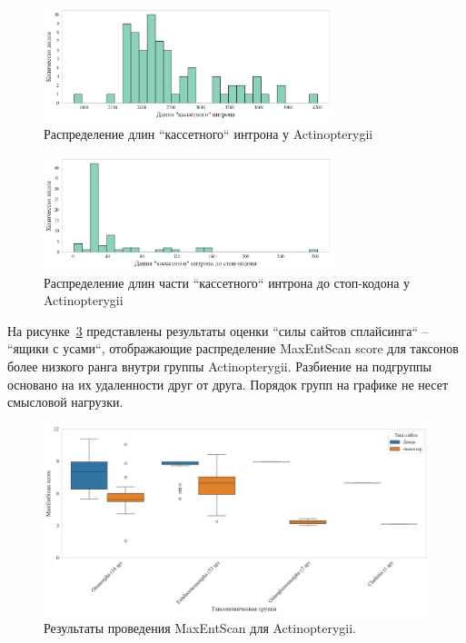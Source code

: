 \begin{figure}[hb] %
    \centering
    \includegraphics[width=0.75\textwidth]{images/Actinopterygii_intron}
    \caption{Распределение длин ``кассетного`` интрона у Actinopterygii}
    \label{fig:Actinopterygii_intron}
\end{figure}

\begin{figure}[ht] %
    \centering
    \includegraphics[width=0.75\textwidth]{images/Actinopterygii_intron_stop}
    \caption{Распределение длин части ``кассетного`` интрона до стоп-кодона у Actinopterygii}
    \label{fig:Actinopterygii_intron_stop}
\end{figure}

На рисунке~\ref{fig:Actinopterygii_maxentscan} представлены результаты оценки ``силы сайтов сплайсинга`` – ``ящики с усами``, отображающие распределение MaxEntScan score для таксонов более низкого ранга внутри группы Actinopterygii.
Разбиение на подгруппы основано на их удаленности друг от друга.
Порядок групп на графике не несет смысловой нагрузки.

\begin{figure}[h] %
    \centering
    \includegraphics[width=1.0\textwidth]{images/Actinopterygii_maxentscan}
    \caption{Результаты проведения MaxEntScan для Actinopterygii.}
    \label{fig:Actinopterygii_maxentscan}
\end{figure}


